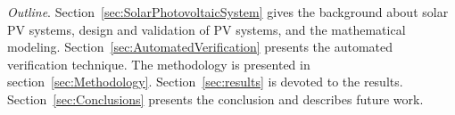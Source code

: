 \documentclass[review]{elsarticle}
\begin{document}
%
\textit{Outline}. Section~\ref{sec:SolarPhotovoltaicSystem} gives the background about solar PV systems, design and validation of PV systems, and the mathematical modeling. Section~\ref{sec:AutomatedVerification} presents the automated verification technique. The methodology is presented in section~\ref{sec:Methodology}. Section~\ref{sec:results} is devoted to the results. Section~\ref{sec:Conclusions} presents the conclusion and describes future work.
%
\end{document}
